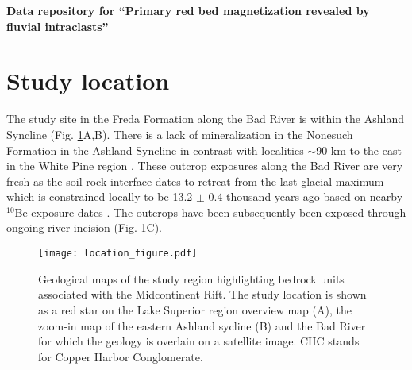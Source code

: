 \documentclass[11pt,letterpaper]{article}
\begin{document}
\begin{flushleft}
{\Large \textbf{Data repository for ``Primary red bed magnetization revealed by fluvial intraclasts''}}

\end{flushleft}

\section*{Study location}
The study site in the Freda Formation along the Bad River is within the Ashland Syncline (Fig. \ref{fig:location_figure}A,B). There is a lack of mineralization in the Nonesuch Formation in the Ashland Syncline in contrast with localities $\sim$90 km to the east in the White Pine region \citep{Stewart2017a}. These outcrop exposures along the Bad River are very fresh as the soil-rock interface dates to retreat from the last glacial maximum which is constrained locally to be 13.2 $\pm$ 0.4 thousand years ago based on nearby $^{10}$Be exposure dates \citep{Ullman2015a}. The outcrops have been subsequently been exposed through ongoing river incision (Fig. \ref{fig:location_figure}C).

\begin{figure}[!ht]
\noindent\texttt{[image: location\_figure.pdf]}
\caption{\small{Geological maps of the study region highlighting bedrock units associated with the Midcontinent Rift. The study location is shown as a red star on the Lake Superior region overview map (A), the zoom-in map of the eastern Ashland sycline (B) and the Bad River for which the geology is overlain on a satellite image. CHC stands for Copper Harbor Conglomerate.}}
\label{fig:location_figure}
\end{figure} 

\singlespacing

\newpage



\end{document}
